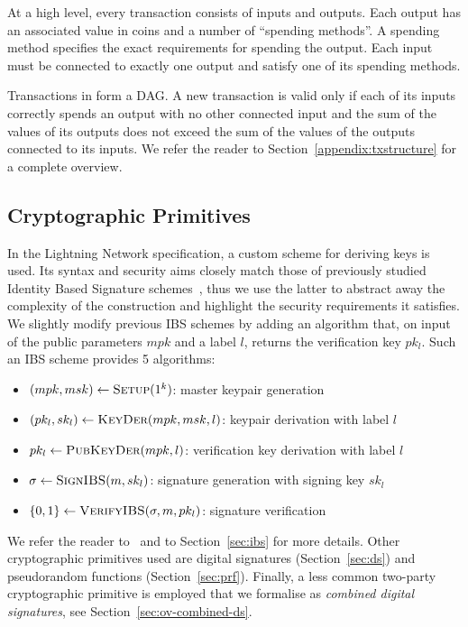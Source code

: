     At a high level, every transaction consists of inputs and outputs. Each
    output has an associated value in coins and a number of ``spending
    methods''. A spending method specifies the exact requirements for spending
    the output. Each input must be connected to exactly one output and satisfy
    one of its spending methods.

    Transactions in \ledger{} form a DAG. A new transaction is valid only if
    each of its inputs correctly spends an output with no other connected input
    and the sum of the values of its outputs does not exceed the sum of the
    values of the outputs connected to its inputs. We refer the reader to
    Section~\ref{appendix:txstructure} for a complete overview.

  \subsection{Cryptographic Primitives}
    In the Lightning Network specification, a custom scheme for deriving keys is
    used. Its syntax and security aims closely match those of previously studied
    Identity Based Signature schemes~\cite{ibsshamir,ibspaterson}, thus we use
    the latter to abstract away the complexity of the construction and highlight
    the security requirements it satisfies. We slightly modify previous IBS
    schemes by adding an algorithm that, on input of the public parameters $mpk$
    and a label $l$, returns the verification key $pk_l$. Such an IBS scheme
    provides 5 algorithms:
    \begin{itemize}
      \item $(mpk, msk) \leftarrow \textsc{Setup}(1^k)$: master keypair
      generation
      \item $(pk_l, sk_l) \leftarrow \textsc{KeyDer}(mpk, msk, l)$: keypair
      derivation with label $l$
      \item $pk_l \leftarrow \textsc{PubKeyDer}(mpk, l)$: verification key
      derivation with label $l$
      \item $\sigma \leftarrow \textsc{SignIBS}(m, sk_l)$: signature generation
      with signing key $sk_l$
      \item $\{0, 1\} \leftarrow \textsc{VerifyIBS}(\sigma, m, pk_l)$: signature
      verification
    \end{itemize}
    We refer the reader to~\cite{ibspaterson} and to Section~\ref{sec:ibs} for more details. Other
    cryptographic primitives used are digital signatures (Section~\ref{sec:ds}) and pseudorandom
    functions (Section~\ref{sec:prf}). Finally, a less common two-party cryptographic primitive is
    employed that we formalise as \emph{combined digital signatures}, see
    Section~\ref{sec:ov-combined-ds}.
